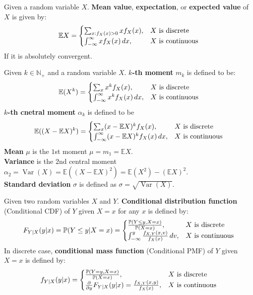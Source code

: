 \documentclass{huhtakm-template-book}
\newcommand{\prob}{\mathbb{P}}
\newcommand{\expect}{\mathbb{E}}
\DeclareMathOperator{\Var}{Var}
\begin{document}
\begin{sdefn}
	Given a random variable $X$. \textbf{Mean value}, \textbf{expectation}, or \textbf{expected value} of $X$ is given by:
	\begin{equation*}
		\expect X=\begin{cases}
			\sum_{x:f_{X}(x)>0}xf_{X}(x), &X\text{ is discrete}\\
			\intinfty xf_{X}(x)\,dx, &X\text{ is continuous}
		\end{cases}
	\end{equation*}
	If it is absolutely convergent.
\end{sdefn}
\begin{sdefn}
	Given $k\in\mathbb{N}_{+}$ and a random variable $X$. \textbf{$k$-th moment} $m_{k}$ is defined to be:
	\begin{equation*}
		\expect(X^{k})=\begin{cases}
			\sum_{x}x^{k}f_{X}(x), &X\text{ is discrete}\\
			\intinfty x^{k}f_{X}(x)\,dx, &X\text{ is continuous}
		\end{cases}
	\end{equation*}
	\textbf{$k$-th cnetral moment} $\alpha_{k}$ is defined to be
	\begin{equation*}
		\expect((X-\expect X)^{k})=\begin{cases}
			\sum_{x}(x-\expect X)^{k}f_{X}(x), &X\text{ is discrete}\\
			\intinfty(x-\expect X)^{k}f_{X}(x)\,dx, &X\text{ is continuous}
		\end{cases}
	\end{equation*}
	\textbf{Mean} $\mu$ is the $1$st moment $\mu=m_{1}=\expect X$.\\
	\textbf{Variance} is the $2$nd central moment $\alpha_{2}=\Var(X)=\expect((X-\expect X)^{2})=\expect(X^{2})-(\expect X)^{2}$.\\
	\textbf{Standard deviation} $\sigma$ is defined as $\sigma=\sqrt{\Var(X)}$.
\end{sdefn}
\begin{sdefn}
	Given two random variables $X$ and $Y$. \textbf{Conditional distribution function} (Conditional CDF) of $Y$ given $X=x$ for any $x$ is defined by:
	\begin{equation*}
		F_{Y|X}(y|x)=\prob(Y\leq y|X=x)=\begin{cases}
			\frac{\prob(Y\leq y,X=x)}{\prob(X=x)}, &X\text{ is discrete}\\
			\intlu{-\infty}{y}\frac{f_{X,Y}(x,v)}{f_{X}(x)}\,dv, &X\text{ is continuous}
		\end{cases}
	\end{equation*}
	In discrete case, \textbf{conditional mass function} (Conditional PMF) of $Y$ given $X=x$ is defined by:
	\begin{equation*}
		f_{Y|X}(y|x)=\begin{cases}
			\frac{\prob(Y=y,X=x)}{\prob(X=x)}, &X\text{ is discrete}\\
			\pdv*{F_{Y|X}(y|x)}{y}=\frac{f_{X,Y}(x,y)}{f_{X}(x)}, &X\text{ is continuous}
		\end{cases}
	\end{equation*}
\end{sdefn}
\end{document}
